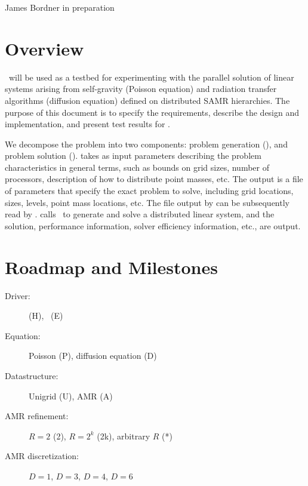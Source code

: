 \documentclass[10pt]{article}
\begin{document}
      {James Bordner}
      {in preparation}

\tableofcontents
\section{Overview}

   \hypresolve\ will be used as a testbed for experimenting with the
   parallel solution of linear systems arising from self-gravity
   (Poisson equation) and radiation transfer algorithms (diffusion
   equation) defined on distributed SAMR hierarchies.  The purpose of
   this document is to specify the requirements, describe the design
   and implementation, and present test results for \hypresolve.

   We decompose the problem into two components: problem generation
   (), and problem solution ().
    takes as input parameters describing the problem
   characteristics in general terms, such as bounds on grid sizes,
   number of processors, description of how to distribute point
   masses, etc.  The output is a file of parameters that specify the
   exact problem to solve, including grid locations, sizes, levels,
   point mass locations, etc.  The file output by 
   can be subsequently read by .  
   calls \hypre\ to generate and solve a distributed linear system,
   and the solution, performance information, solver efficiency
   information, etc., are output.

\section{Roadmap and Milestones}


\begin{description}
\item[Driver: ]  (H), \enzo\ (E)
\item[Equation: ] Poisson (P), diffusion equation (D)
\item[Datastructure: ] Unigrid (U), AMR (A)
\item[AMR refinement: ] $R=2$ (2), $R=2^k$ (2k), arbitrary $R$ (*)
\item[AMR discretization: ] $D=1$, $D=3$, $D=4$, $D=6$
\end{description}
\end{document}
